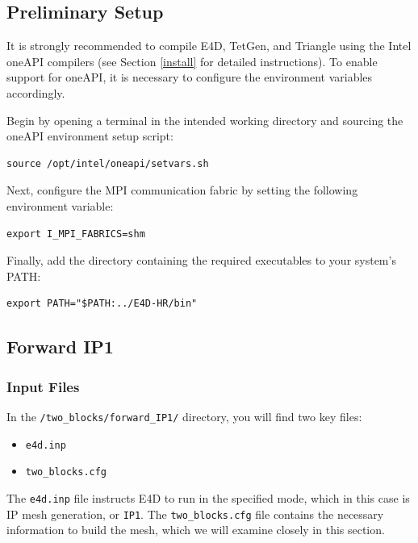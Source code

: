 \documentclass[a4paper,12pt]{article}
\begin{document}
\subsection{Preliminary Setup} \label{prelim}

It is strongly recommended to compile E4D, TetGen, and Triangle using the Intel oneAPI compilers (see Section \ref{install} for detailed instructions). To enable support for oneAPI, it is necessary to configure the environment variables accordingly.

Begin by opening a terminal in the intended working directory and sourcing the oneAPI environment setup script:

\begin{verbatim}
source /opt/intel/oneapi/setvars.sh
\end{verbatim}

Next, configure the MPI communication fabric by setting the following environment variable:

\begin{verbatim}
export I_MPI_FABRICS=shm
\end{verbatim}

Finally, add the directory containing the required executables to your system’s PATH:

\begin{verbatim}
export PATH="$PATH:../E4D-HR/bin"
\end{verbatim}

\subsection{Forward IP1}

\subsubsection{Input Files}

In the \texttt{/two\_blocks/forward\_IP1/} directory, you will find two key files:

\begin{itemize}
    \item \texttt{e4d.inp}
    \item \texttt{two\_blocks.cfg}
\end{itemize}

The \texttt{e4d.inp} file instructs E4D to run in the specified mode, which in this case is IP mesh generation, or \texttt{IP1}. The \texttt{two\_blocks.cfg} file contains the necessary information to build the mesh, which we will examine closely in this section.
\end{document}
